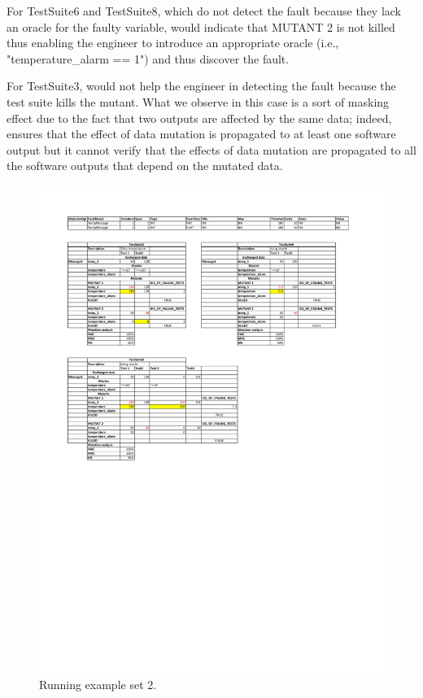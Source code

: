 For TestSuite6 and TestSuite8, which do not detect the fault because they lack an oracle for the faulty variable, \APPR would indicate that MUTANT 2 is not killed thus enabling the engineer to introduce an appropriate oracle (i.e., "temperature\_alarm == 1") and thus discover the fault. 

For TestSuite3, \APPR would not help the engineer in detecting the fault because the test suite kills the mutant. What we observe in this case is a sort of masking effect due to the fact that two outputs are affected by the same data; indeed, \APPR ensures that the effect of data mutation is propagated to at least one software output but it cannot verify that the effects of data mutation are propagated to all the software outputs that depend on the mutated data. 

\begin{figure}[tb]
\centering
\includegraphics[width=14cm]{damat/DataDrivenExample2}
\caption{Running example set 2.}
\label{fig:damat:RunningExample2}
\end{figure}

